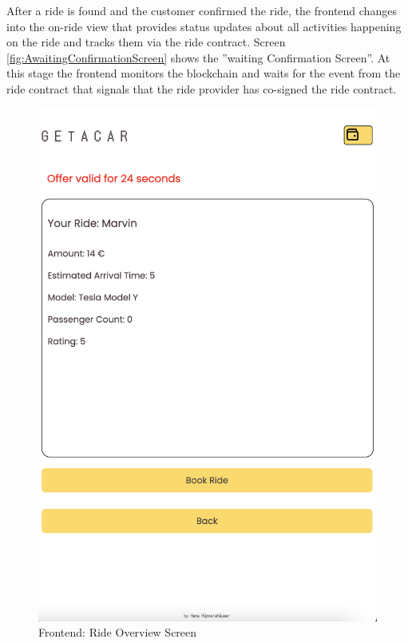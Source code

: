 After a ride is found and the customer confirmed the ride, the frontend changes into the on-ride view that provides status updates about all activities happening on the ride and tracks them via the ride contract. Screen \ref{fig:AwaitingConfirmationScreen} shows the ''waiting Confirmation Screen''. At this stage the frontend monitors the blockchain and waits for the event from the ride contract that signals that the ride provider has co-signed the ride contract.


\begin{figure}[H]
    \centering
    
    \begin{minipage}{0.45\linewidth}
        \centering
        \includegraphics[width=\linewidth]{data/ffss/5.png}
        \caption{Frontend: Ride Overview Screen}

\end{minipage}
\end{figure}
